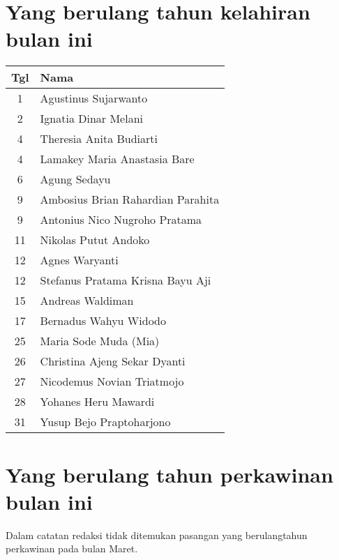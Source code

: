 
\section*{Yang berulang tahun kelahiran bulan ini}


\begin{longtable}{|c|l|} 
\hline Tgl & Nama \\ \hline
1 & Agustinus Sujarwanto \\ 
2 & Ignatia Dinar Melani \\  
4 & Theresia Anita Budiarti \\  
4 & Lamakey Maria Anastasia Bare  \\
6 &  Agung Sedayu \\ 
9 & Ambosius Brian Rahardian Parahita \\ 
9 & Antonius Nico Nugroho Pratama \\  
11 & Nikolas Putut Andoko \\ 
12 & Agnes Waryanti \\  
12 & Stefanus Pratama Krisna Bayu Aji \\ 
15 & Andreas Waldiman \\ 
17 & Bernadus Wahyu Widodo \\
25 & Maria Sode Muda (Mia) \\
26 & Christina Ajeng Sekar Dyanti  \\
27 & Nicodemus Novian Triatmojo \\ 
28 & Yohanes Heru Mawardi \\ 
31 & Yusup Bejo Praptoharjono \\ \hline  
\end{longtable}
 
\section*{Yang berulang tahun perkawinan  bulan ini}

Dalam catatan redaksi tidak ditemukan pasangan yang berulangtahun perkawinan pada bulan Maret. 